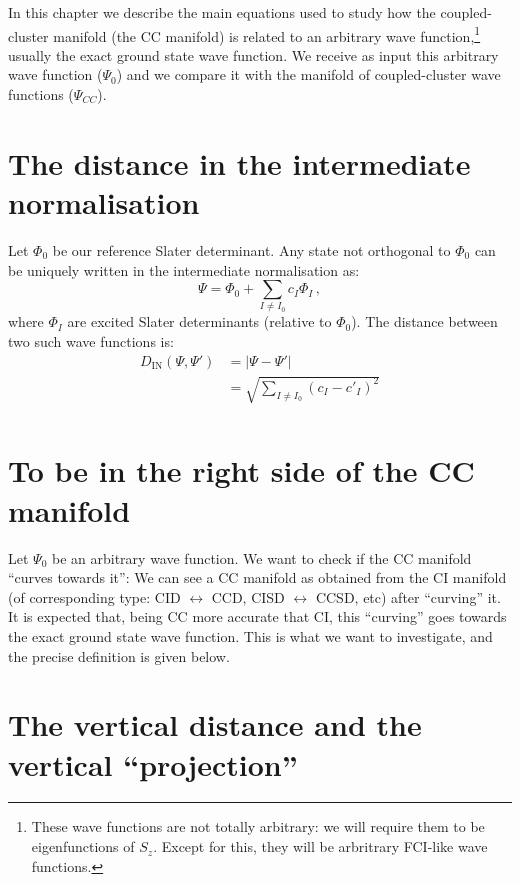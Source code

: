 In this chapter we describe the main equations used to study how the coupled-cluster manifold
(the CC manifold)
is related to an arbitrary wave function,\footnote{
  These wave functions are not totally arbitrary:
  we will require them to be eigenfunctions of $S_z$.
  Except for this, they will be arbritrary FCI-like wave functions.
  }
usually the exact ground state wave function.
We receive as input this arbitrary wave function ($\Psi_0$) and we compare it with the manifold
of coupled-cluster wave functions ($\Psi_{CC}$).

\section{The distance in the intermediate normalisation}

Let $\Phi_0$ be our reference Slater determinant.
Any state not orthogonal to $\Phi_0$ can be uniquely written in the intermediate normalisation as:
\begin{equation}
  \Psi = \Phi_0 + \sum_{I \ne I_0} c_I \Phi_I\,,
\end{equation}
where $\Phi_I$ are excited Slater determinants (relative to $\Phi_0$).
The distance between two such wave functions is:
\begin{equation}\label{eq:dist_intem_norm}
  \begin{split}
    D_\text{IN}(\Psi,\Psi') &= |\Psi - \Psi'|\\
    &=\sqrt{\sum_{I \ne I_0} (c_I - c'_I)^2 }\\
  \end{split}
\end{equation}

\section{To be in the right side of the CC manifold}

Let $\Psi_0$ be an arbitrary wave function.
We want to check if the CC manifold ``curves towards it'':
We can see a CC  manifold as obtained from the CI manifold (of corresponding type:
CID $\leftrightarrow$ CCD, CISD $\leftrightarrow$ CCSD, etc)
after ``curving'' it.
It is expected that, being CC more accurate that CI, this ``curving'' goes towards the exact
ground state wave function.
This is what we want to investigate, and the precise definition is given below.

\section{The vertical distance and the vertical ``projection''}

